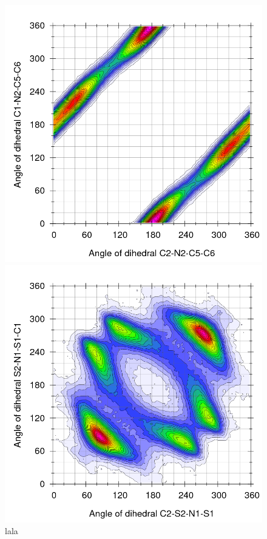 \documentclass[3p,twocolumn]{elsarticle}
\begin{document}
\begin{figure}[H]
\centering
  \includegraphics[width=\linewidth]{Ludwig.png}%

  \includegraphics[width=\linewidth]{Ludwig_anion.png}%
\caption{lala}
\label{e}
\end{figure}
\end{document}
